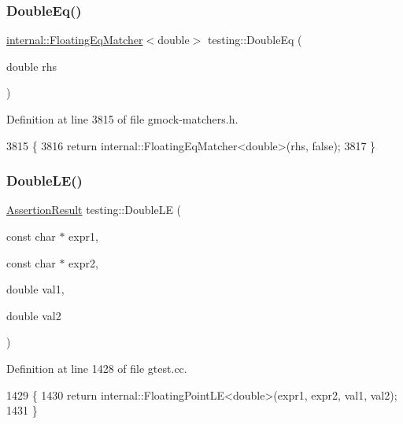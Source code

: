 \subsubsection{\texorpdfstring{Double\+Eq()}{DoubleEq()}}
{\footnotesize\ttfamily \hyperlink{classtesting_1_1internal_1_1FloatingEqMatcher}{internal\+::\+Floating\+Eq\+Matcher}$<$double$>$ testing\+::\+Double\+Eq (\begin{DoxyParamCaption}\item[{double}]{rhs }\end{DoxyParamCaption})\hspace{0.3cm}{\ttfamily [inline]}}



Definition at line 3815 of file gmock-\/matchers.\+h.


\begin{DoxyCode}
3815                                                               \{
3816   \textcolor{keywordflow}{return} internal::FloatingEqMatcher<double>(rhs, \textcolor{keyword}{false});
3817 \}
\end{DoxyCode}
\mbox{\label{namespacetesting_ae10e2bb304b74abd1b06a2d912a8b43b}} 
\subsubsection{\texorpdfstring{Double\+L\+E()}{DoubleLE()}}
{\footnotesize\ttfamily \hyperlink{classtesting_1_1AssertionResult}{Assertion\+Result} testing\+::\+Double\+LE (\begin{DoxyParamCaption}\item[{const char $\ast$}]{expr1,  }\item[{const char $\ast$}]{expr2,  }\item[{double}]{val1,  }\item[{double}]{val2 }\end{DoxyParamCaption})}



Definition at line 1428 of file gtest.\+cc.


\begin{DoxyCode}
1429                                                    \{
1430   \textcolor{keywordflow}{return} internal::FloatingPointLE<double>(expr1, expr2, val1, val2);
1431 \}
\end{DoxyCode}
\mbox{\label{namespacetesting_aaee08ecb6815ef8398bbcb4e56d56d44}} 
